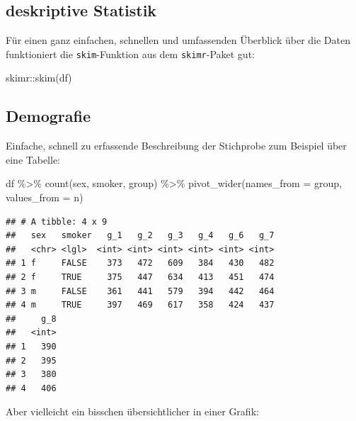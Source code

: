 \documentclass[
]{book}
\newenvironment{Shaded}{\begin{snugshade}}{\end{snugshade}}
\newcommand{\AttributeTok}[1]{\textcolor[rgb]{0.77,0.63,0.00}{#1}}
\newcommand{\FunctionTok}[1]{\textcolor[rgb]{0.00,0.00,0.00}{#1}}
\newcommand{\NormalTok}[1]{#1}
\newcommand{\SpecialCharTok}[1]{\textcolor[rgb]{0.00,0.00,0.00}{#1}}
\begin{document}
\hypertarget{deskriptive-statistik-1}{%
\subsection{deskriptive Statistik}\label{deskriptive-statistik-1}}

Für einen ganz einfachen, schnellen und umfassenden Überblick über die Daten funktioniert die \texttt{skim}-Funktion aus dem \texttt{skimr}-Paket gut:

\begin{Shaded}
\begin{Highlighting}[]
\NormalTok{skimr}\SpecialCharTok{::}\FunctionTok{skim}\NormalTok{(df)}
\end{Highlighting}
\end{Shaded}

\hypertarget{demografie}{%
\subsection{Demografie}\label{demografie}}

Einfache, schnell zu erfassende Beschreibung der Stichprobe zum Beispiel über eine Tabelle:

\begin{Shaded}
\begin{Highlighting}[]
\NormalTok{df }\SpecialCharTok{\%\textgreater{}\%} 
  \FunctionTok{count}\NormalTok{(sex, smoker, group) }\SpecialCharTok{\%\textgreater{}\%} 
  \FunctionTok{pivot\_wider}\NormalTok{(}\AttributeTok{names\_from =}\NormalTok{ group,}
              \AttributeTok{values\_from =}\NormalTok{ n)}
\end{Highlighting}
\end{Shaded}

\begin{verbatim}
## # A tibble: 4 x 9
##   sex   smoker   g_1   g_2   g_3   g_4   g_6   g_7
##   <chr> <lgl>  <int> <int> <int> <int> <int> <int>
## 1 f     FALSE    373   472   609   384   430   482
## 2 f     TRUE     375   447   634   413   451   474
## 3 m     FALSE    361   441   579   394   442   464
## 4 m     TRUE     397   469   617   358   424   437
##     g_8
##   <int>
## 1   390
## 2   395
## 3   380
## 4   406
\end{verbatim}

Aber vielleicht ein bisschen übersichtlicher in einer Grafik:
\end{document}
